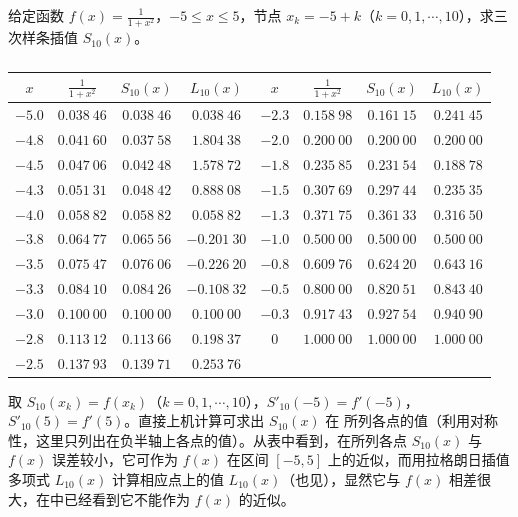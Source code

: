 \documentclass[../../main.tex]{subfiles}%
\begin{document}
\begin{example}
给定函数 $f(x)=\frac{1}{1+x^2}$，$-5\leqslant x\leqslant 5$，节点 $x_k=-5+k$（$k=0,1,\cdots,10$），求三次样条插值 $S_{10}(x)$。
\end{example}
\begin{solution}

\begin{table}[H]
\centering
\caption{}
\label{table:数值分析例题表格2-7}
\begin{tabular}{c c c c || c c c c}
\hline
$x$ & $\frac{1}{1+x^2}$ & $S_{10}(x)$ & $L_{10}(x)$ & $x$ & $\frac{1}{1+x^2}$ & $S_{10}(x)$ & $L_{10}(x)$ \\
\hline
$-5.0$ & $0.038\ 46$ & $0.038\ 46$ & $0.038\ 46$ & $-2.3$ & $0.158\ 98$ & $0.161\ 15$ & $0.241\ 45$ \\
$-4.8$ & $0.041\ 60$ & $0.037\ 58$ & $1.804\ 38$ & $-2.0$ & $0.200\ 00$ & $0.200\ 00$ & $0.200\ 00$ \\
$-4.5$ & $0.047\ 06$ & $0.042\ 48$ & $1.578\ 72$ & $-1.8$ & $0.235\ 85$ & $0.231\ 54$ & $0.188\ 78$ \\
$-4.3$ & $0.051\ 31$ & $0.048\ 42$ & $0.888\ 08$ & $-1.5$ & $0.307\ 69$ & $0.297\ 44$ & $0.235\ 35$ \\
$-4.0$ & $0.058\ 82$ & $0.058\ 82$ & $0.058\ 82$ & $-1.3$ & $0.371\ 75$ & $0.361\ 33$ & $0.316\ 50$ \\
$-3.8$ & $0.064\ 77$ & $0.065\ 56$ & $-0.201\ 30$ & $-1.0$ & $0.500\ 00$ & $0.500\ 00$ & $0.500\ 00$ \\
$-3.5$ & $0.075\ 47$ & $0.076\ 06$ & $-0.226\ 20$ & $-0.8$ & $0.609\ 76$ & $0.624\ 20$ & $0.643\ 16$ \\
$-3.3$ & $0.084\ 10$ & $0.084\ 26$ & $-0.108\ 32$ & $-0.5$ & $0.800\ 00$ & $0.820\ 51$ & $0.843\ 40$ \\
$-3.0$ & $0.100\ 00$ & $0.100\ 00$ & $0.100\ 00$ & $-0.3$ & $0.917\ 43$ & $0.927\ 54$ & $0.940\ 90$ \\
$-2.8$ & $0.113\ 12$ & $0.113\ 66$ & $0.198\ 37$ & $0$ & $1.000\ 00$ & $1.000\ 00$ & $1.000\ 00$ \\
$-2.5$ & $0.137\ 93$ & $0.139\ 71$ & $0.253\ 76$ &  &  &  &  \\
\hline
\end{tabular}
\end{table}
取 $S_{10}(x_k)=f(x_k)$（$k=0,1,\cdots,10$），$S'_{10}(-5)=f'(-5)$，$S'_{10}(5)=f'(5)$。直接上机计算可求出 $S_{10}(x)$ 在 所列各点的值（利用对称性，这里只列出在负半轴上各点的值）。从表中看到，在所列各点 $S_{10}(x)$ 与 $f(x)$ 误差较小，它可作为 $f(x)$ 在区间 $[-5,5]$ 上的近似，而用拉格朗日插值多项式 $L_{10}(x)$ 计算相应点上的值 $L_{10}(x)$（也见），显然它与 $f(x)$ 相差很大，在中已经看到它不能作为 $f(x)$ 的近似。

\end{solution}
\end{document}
